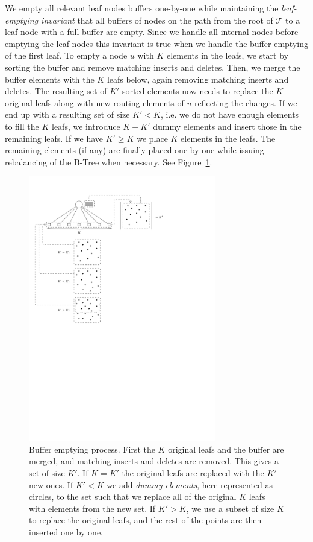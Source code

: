 \documentclass[twoside,11pt,openright]{report}
\begin{document}
We empty all relevant leaf nodes buffers one-by-one while maintaining the \textit{leaf-emptying invariant} that all buffers of nodes on the path from the root of $\mathcal{T}$ to a leaf node with a full buffer are empty. Since we handle all internal nodes before emptying the leaf nodes this invariant is true when we handle the buffer-emptying of the first leaf. To empty a node $u$ with $K$ elements in the leafs, we start by sorting the buffer and remove matching inserts and deletes. Then, we merge the buffer elements with the $K$ leafs below, again removing matching inserts and deletes. The resulting set of $K'$ sorted elements now needs to replace the $K$ original leafs along with new routing elements of $u$ reflecting the changes. If we end up with a resulting set of size $K' < K$, i.e. we do not have enough elements to fill the $K$ leafs, we introduce $K-K'$ dummy elements and insert those in the remaining leafs. If we have $K' \geq K$ we place $K$ elements in the leafs. The remaining elements (if any) are finally placed one-by-one while issuing rebalancing of the B-Tree when necessary. See Figure~\ref{fig:buffer_tree_buffer_empty}.

\begin{figure}[H]
	\centering
	\includegraphics[width=0.73\textwidth]{../figures/buffer_tree_buffer_empty}
	\caption{Buffer emptying process. First the $K$ original leafs and the buffer are merged, and matching inserts and deletes are removed. This gives a set of size $K'$. If $K = K'$ the original leafs are replaced with the $K'$ new ones. If $K' < K$ we add \textit{dummy elements}, here represented as circles, to the set such that we replace all of the original $K$ leafs with elements from the new set. If $K' > K$, we use a subset of size $K$ to replace the original leafs, and the rest of the points are then inserted one by one.}
	\label{fig:buffer_tree_buffer_empty}
\end{figure}
\end{document}
